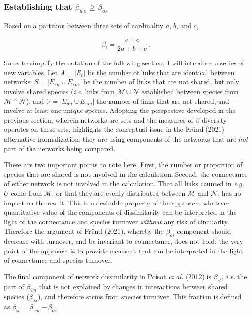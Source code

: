 \documentclass[10pt,oneside]{article}
\begin{document}
\hypertarget{establishing-that-beta_wn-ge-beta_os}{%
\subsubsection{\texorpdfstring{Establishing that
\(\beta_{wn} \ge \beta_{os}\)}{Establishing that \textbackslash beta\_\{wn\} \textbackslash ge \textbackslash beta\_\{os\}}}\label{establishing-that-beta_wn-ge-beta_os}}

Based on a partition between three sets of cardinality \(a\), \(b\), and
\(c\),

\[\beta_t = \frac{b+c}{2a+b+c}\,.\]

So as to simplify the notation of the following section, I will
introduce a series of new variables. Let \(A = |E_c|\) be the number of
links that are identical between networks; \(S = |E_{sn} \cup E_{sm}|\)
be the number of links that are not shared, but only involve shared
species (\emph{i.e.} links from \(\mathcal{M}\cup\mathcal{N}\)
established between species from \(\mathcal{M}\cap\mathcal{N}\)); and
\(U = |E_{un} \cup E_{um}|\) the number of links that are not shared,
and involve at least one unique species. Adopting the perspective
developed in the previous section, wherein networks are sets and the
measures of \(\beta\)-diversity operates on these sets, highlights the
conceptual issue in the Fründ (2021) alternative normalization: they are
using components of the networks that are \emph{not} part of the
networks being compared.

There are two important points to note here. First, the number or
proportion of species that are shared is not involved in the
calculation. Second, the connectance of either network is not involved
in the calculation. That all links counted in \emph{e.g.} \(U\) come
from \(\mathcal{M}\), or that they are evenly distributed between
\(\mathcal{M}\) and \(\mathcal{N}\), has no impact on the result. This
is a desirable property of the approach: whatever quantitative value of
the components of dissimilarity can be interpreted in the light of the
connectance and species turnover \emph{without} any risk of circularity.
Therefore the argument of Fründ (2021), whereby the \(\beta_{os}\)
component should decrease with turnover, and be invariant to
connectance, does not hold: the very point of the approach is to provide
measures that can be interpreted in the light of connectance and species
turnover.

The final component of network dissimilarity in Poisot \emph{et al.}
(2012) is \(\beta_{st}\), \emph{i.e.} the part of \(\beta_{wn}\) that is
not explained by changes in interactions between shared species
(\(\beta_{os}\)), and therefore stems from species turnover. This
fraction is defined as \(\beta_{st} = \beta_{wn}-\beta_{os}\).
\end{document}
